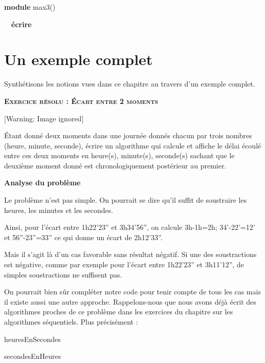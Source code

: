 {\sffamily
\textbf{module} max3()}

{\sffamily
\ \ \textbf{écrire} \textstyleMotCl{\textmd{
)}}}

{\sffamily
{}}

\section{Un exemple complet}
{
Synthétisons les notions vues dans ce chapitre au travers
d'un exemple complet.}

{\sffamily\bfseries\scshape
Exercice résolu : Écart entre 2 moments}

\begin{center}
 [Warning: Image ignored] %

\end{center}
{
Étant donné deux moments dans une journée donnés chacun par trois
nombres (heure, minute, seconde), écrire un algorithme qui calcule et
affiche le délai écoulé entre ces deux moments en heure(s), minute(s),
seconde(s) sachant que le deuxième moment donné est chronologiquement
postérieur au premier.}

{\sffamily\bfseries
Analyse du problème}

{
Le problème n'est pas simple. On pourrait se dire
qu'il suffit de soustraire les heures, les minutes et
les secondes.}

{
Ainsi, pour l'écart entre
1h22'23'' et
3h34'56'', on
calcule 3h-1h=2h;
34'-22'=12' et
56''-23''=33''
ce qui donne un écart de
2h12'33''.}

{
Mais il s'agit là d'un cas favorable
sans résultat négatif. Si une des soustractions est négative, comme par
exemple pour l'écart entre
1h22'23'' et
3h11'12'', de
simples soustractions ne suffisent pas.}

{
On pourrait bien sûr compléter notre code pour tenir compte de tous les
cas mais il existe aussi une autre approche. Rappelons-nous que nous
avons déjà écrit des algorithmes proches de ce problème dans les
exercices du chapitre sur les algorithmes séquentiels. Plus précisément
:}

{\sffamily
{} heuresEnSecondes}

{\sffamily
{} secondesEnHeures}

